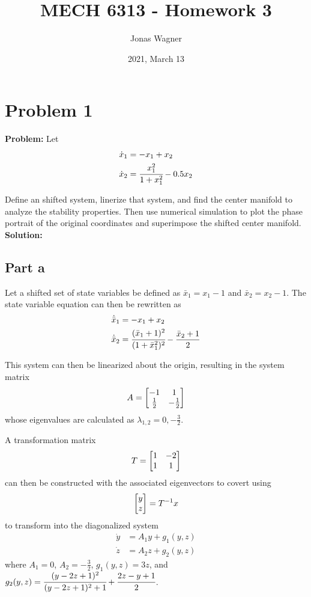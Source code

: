 \documentclass[letter]{article}
\title{MECH 6313 - Homework 3}
\author{Jonas Wagner}
\date{2021, March 13}
\begin{document}
\maketitle


\section{Problem 1}
\textbf{Problem:}
Let
\begin{equation}
	\begin{aligned}
		\dot{x}_1 &= -x_1 + x_2\\
		\dot{x}_2 &= \cfrac{x_1^2}{1 + x_1^2} - 0.5 x_2
	\end{aligned}
\end{equation}

Define an shifted system, linerize that system, and find the center manifold to analyze the stability properties. Then use numerical simulation to plot the phase portrait of the original coordinates and superimpose the shifted center manifold.\\

\textbf{Solution:}
\subsection{Part a}
Let a shifted set of state variables be defined as $\bar{x}_1 = x_1 - 1$ and $\bar{x}_2 = x_2 - 1$. The state variable equation can then be rewritten as
\begin{equation}
	\begin{aligned}
		\dot{\bar{x}}_1 &= -x_1 + x_2\\
		\dot{\bar{x}}_2 &= \cfrac{(\bar{x}_1+1)^2}{(1 + \bar{x}_1^2)^2} - \frac{\bar{x}_2 + 1}{2}
	\end{aligned}
\end{equation}

This system can then be linearized about the origin, resulting in the system matrix
\begin{equation}
	A = \mqty[-1 & 1\\ \frac{1}{2} & -\frac{1}{2}]
\end{equation}
whose eigenvalues are calculated as $\lambda_{1,2} = 0, -\frac{3}{2}$.

A transformation matrix $$T = \mqty[1&-2\\1&1]$$ can then be constructed with the associated eigenvectors to covert using $$\mqty[y\\z] = T^{-1} x$$ to transform into the diagonalized system
\begin{equation}
	\begin{aligned}
		\dot{y} &= A_1 y + g_1(y,z)\\
		\dot{z} &= A_2 z + g_2(y,z)
	\end{aligned}
\end{equation}
where $A_1 = 0$, $A_2 = -\frac{3}{2}$, $g_1(y,z) = 3z$, and $g_2(y,z) = \cfrac{(y-2z +1)^2}{(y-2z+1)^2+1} + \cfrac{2z - y + 1}{2}$.\\
\end{document}
